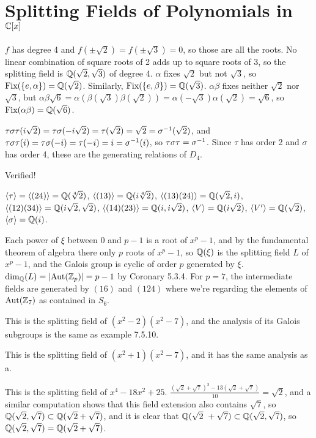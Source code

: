 \documentclass[11pt, oneside]{article}   	%
\begin{document}
\section{Splitting Fields of Polynomials in $\mathbb{C}[x]$}
\be
\item $f$ has degree 4 and $f(\pm\sqrt{2}) = f(\pm\sqrt{3}) = 0$, so those are all the roots. No linear combination of square roots of 2 adds up to square roots of 3, so the splitting field is $\mathbb{Q}(\sqrt{2}, \sqrt{3})$ of degree 4. $\alpha$ fixes $\sqrt{2}$ but not $\sqrt{3}$, so $\text{Fix}(\{e, \alpha\}) = \mathbb{Q}(\sqrt{2})$. Similarly, $\text{Fix}(\{e, \beta\}) = \mathbb{Q}(\sqrt{3})$. $\alpha\beta$ fixes neither $\sqrt{2}$ nor $\sqrt{3}$, but $\alpha\beta\sqrt{6} = \alpha(\beta(\sqrt{3})\beta(\sqrt{2})) = \alpha(-\sqrt{3})\alpha(\sqrt{2}) = \sqrt{6}$, so $\text{Fix}(\alpha\beta) = \mathbb{Q}(\sqrt{6})$. 
\item $\tau\sigma\tau(i\sqrt{2}) = \tau\sigma(-i\sqrt{2}) = \tau(\sqrt{2}) = \sqrt{2} = \sigma^{-1}(\sqrt{2})$, and $\tau\sigma\tau(i) = \tau\sigma(-i) = \tau(-i) = i = \sigma^{-1}(i)$, so $\tau\sigma\tau = \sigma^{-1}$. Since $\tau$ has order 2 and $\sigma$ has order 4, these are the generating relations of $D_4$.
\item Verified!
\item $\langle \tau \rangle = \langle (2 4) \rangle = \mathbb{Q}(\sqrt[4]{2})$, $\langle (13) \rangle = \mathbb{Q}(i\sqrt[4]{2})$, $\langle (13)(24) \rangle = \mathbb{Q}(\sqrt{2}, i)$, $\langle (12)(34) \rangle = \mathbb{Q}(i\sqrt{2}, \sqrt{2})$, $\langle (14)(23) \rangle = \mathbb{Q}(i, i\sqrt{2})$, $\langle V \rangle = \mathbb{Q}(i\sqrt{2})$, $\langle V' \rangle = \mathbb{Q}(\sqrt{2})$, $\langle \sigma \rangle = \mathbb{Q}(i)$. 
\item Each power of $\xi$ between 0 and $p-1$ is a root of $x^p-1$, and by the fundamental theorem of algebra there only $p$ roots of $x^p-1$, so $\mathbb{Q}(\xi)$ is the splitting field $L$ of $x^p-1$, and the Galois group is cyclic of order $p$ generated by $\xi$. $\dim_{\mathbb{Q}}(L) = |\text{Aut}(\mathbb{Z}_p)| = p-1$ by Coronary 5.3.4. For $p=7$, the intermediate fields are generated by $(16)$ and $(124)$ where we're regarding the elements of $\text{Aut}(\mathbb{Z}_7)$ as contained in $S_6$.
\item \be
\item This is the splitting field of $(x^2-2)(x^2-7)$, and the analysis of its Galois subgroups is the same as example 7.5.10.
\item This is the splitting field of $(x^2+1)(x^2-7)$, and it has the same analysis as a.
\item This is the splitting field of $x^4 - 18x^2 + 25$. $\frac{(\sqrt{2} + \sqrt{7})^3 - 13(\sqrt{2} + \sqrt{7})}{10} = \sqrt{2}$, and a similar computation shows that this field extension also contains $\sqrt{7}$, so $\mathbb{Q}(\sqrt{2}, \sqrt{7}) \subset \mathbb{Q}(\sqrt{2} + \sqrt{7})$, and it is clear that $\mathbb{Q}(\sqrt{2}\ + \sqrt{7}) \subset \mathbb{Q}(\sqrt{2}, \sqrt{7})$, so $\mathbb{Q}(\sqrt{2}, \sqrt{7}) = \mathbb{Q}(\sqrt{2} + \sqrt{7})$.
\end{document}

